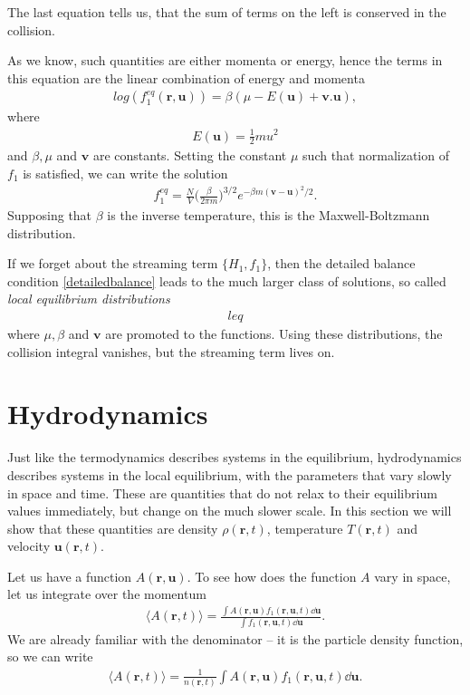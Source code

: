 The last equation tells us, that the sum of terms on the left is conserved in the collision.

As we know, such quantities are either momenta or energy, hence the terms in this equation are the linear combination of energy and momenta
\begin{align*}
log(f_1^{eq}(\bm{r},\bm{u})) = \beta(\mu - E(\bm{u}) + \bm{v}. \bm{u}),
\end{align*}
where
\begin{align*}
E(\bm{u}) = \frac{1}{2} m u^2
\end{align*}
and $\beta,\mu$ and $\bm{v}$ are constants.
Setting the constant $\mu$ such that normalization of $f_1$ is satisfied, we can write the solution
\begin{align} \label{mbt}
f_1^{eq} = \frac{N}{V}\big(\frac{\beta}{2\pi m}\big)^{3/2} e^{-\beta m (\bm{v} - \bm{u})^2/2}.
\end{align}
Supposing that $\beta$ is the inverse temperature, this is the Maxwell-Boltzmann distribution.

If we forget about the streaming term $\big\{ H_1, f_1 \big\}$, then the detailed balance condition \ref{detailedbalance} leads to the much larger class of solutions, so called \textit{local equilibrium distributions}
\begin{align} \label{localequil}
leq
\end{align}
where $\mu,\beta$ and $\bm{v}$ are promoted to the functions.
Using these distributions, the collision integral vanishes, but the streaming term lives on.

\section{Hydrodynamics}
Just like the termodynamics describes systems in the equilibrium, hydrodynamics describes systems in the local equilibrium, with the parameters that vary slowly in space and time.
These are quantities that do not relax to their equilibrium values immediately, but change on the much slower scale. In this section we will show that these quantities are density $\rho(\bm{r},t)$, temperature $T(\bm{r},t)$ and velocity $\bm{u}(\bm{r},t)$.

Let us have a function $A(\bm{r},\bm{u})$.
To see how does the function $A$ vary in space, let us integrate over the momentum
\begin{align*}
\langle A(\bm{r},t) \rangle = \frac{\int A(\bm{r},\bm{u}) f_1(\bm{r},\bm{u},t) \dd \bm{u}}{\int f_1(\bm{r},\bm{u},t) \dd \bm{u}}.
\end{align*}
We are already familiar with the denominator -- it is the particle density function, so we can write
\begin{align*}
\langle A(\bm{r},t) \rangle = \frac{1}{n(\bm{r},t)} \int A(\bm{r},\bm{u}) f_1(\bm{r},\bm{u},t) \dd \bm{u}.
\end{align*} 

